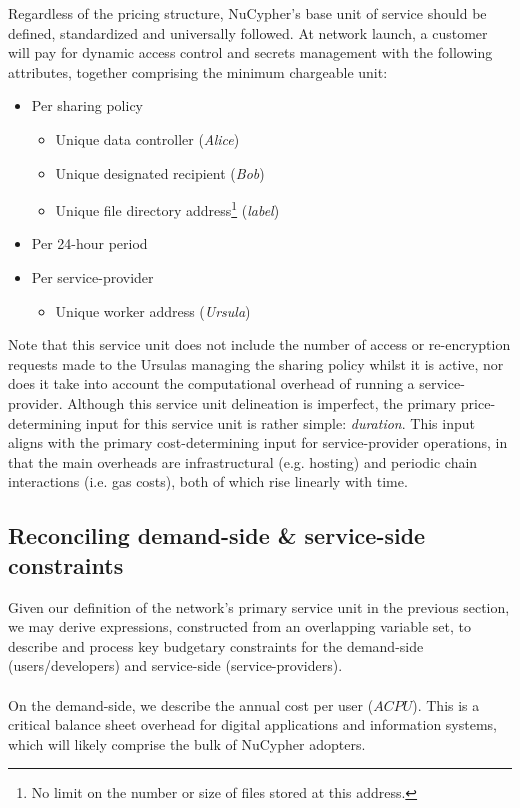 \documentclass[longbibliography,nofootinbib]{revtex4-1}
\begin{document}
Regardless of the pricing structure, NuCypher’s base unit of service should be defined, standardized and universally followed. At network launch, a customer will pay for dynamic access control and secrets management with the following attributes, together comprising the minimum chargeable unit: 
\begin{itemize}
    \item Per sharing policy
    \begin{itemize}
        \item Unique data controller (\textit{Alice})
        \item Unique designated recipient (\textit{Bob})
        \item Unique file directory address\footnote{No limit on the number or size of files stored at this address.} (\textit{label})
    \end{itemize}
    \item Per 24-hour period
    \item Per service-provider
    \begin{itemize}
        \item Unique worker address (\textit{Ursula})
    \end{itemize}
\end{itemize}

Note that this service unit does not include the number of access or re-encryption requests made to the Ursulas managing the sharing policy whilst it is active, nor does it take into account the computational overhead of running a service-provider. Although this service unit delineation is imperfect, the primary price-determining input for this service unit is rather simple: \textit{duration}. This input aligns with the primary cost-determining input for service-provider operations, in that the main overheads are infrastructural (e.g. hosting) and periodic chain interactions (i.e. gas costs), both of which rise linearly with time. 

\subsection{Reconciling demand-side \& service-side constraints}

Given our definition of the network's primary service unit in the previous section, we may derive expressions, constructed from an overlapping variable set, to describe and process key budgetary constraints for the demand-side (users/developers) and service-side (service-providers). 
\\\\
On the demand-side, we describe the annual cost per user ($ACPU$). This is a critical balance sheet overhead for digital applications and information systems, which will likely comprise the bulk of NuCypher adopters.
\end{document}
